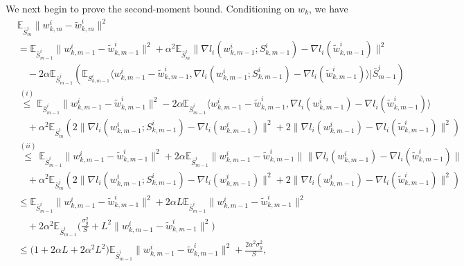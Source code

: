 \documentclass{osudissert96}
\begin{document}
	\vspace{0.1cm}
	We next begin to prove the second-moment bound. Conditioning on $w_k$, we have 
	{\small
	\begin{align*}
	&\mathbb{E}_{\bar S^i_m}\|w_{k,m}^i - \widetilde w_{k,m}^i\|^2 
	\\ &=   \mathbb{E}_{\bar S^i_{m-1}}\|w_{k,m-1}^i - \widetilde w_{k,m-1}^i\|^2  + 
	\alpha^2\mathbb{E}_{\bar S^i_m}\|\nabla l_i(w_{k,m-1}^i; S_{k,m-1}^i)- \nabla l_i(\widetilde w_{k,m-1}^i)\|^2
	\\ & \quad-2\alpha\mathbb{E}_{\bar S^i_{m-1}}\left(\mathbb{E}_{S_{k,m-1}^i} \langle w_{k,m-1}^i - \widetilde w_{k,m-1}^i, \nabla l_i(w_{k,m-1}^i; S_{k,m-1}^i)- \nabla l_i(\widetilde w_{k,m-1}^i)\rangle \big | \bar S^i_{m-1}\right)
	\\ &\overset{(i)}\leq   \mathbb{E}_{\bar S^i_{m-1}}\|w_{k,m-1}^i - \widetilde w_{k,m-1}^i\|^2  -2\alpha\mathbb{E}_{\bar S^i_{m-1}} \langle w_{k,m-1}^i - \widetilde w_{k,m-1}^i, \nabla l_i(w_{k,m-1}^i)- \nabla l_i(\widetilde w_{k,m-1}^i)\rangle
	\\ &\quad +
	\alpha^2\mathbb{E}_{\bar S^i_m}\left(  2\|\nabla l_i(w_{k,m-1}^i; S_{k,m-1}^i)- \nabla l_i( w_{k,m-1}^i)\|^2 + 2\|\nabla l_i( w_{k,m-1}^i)- \nabla l_i(\widetilde w_{k,m-1}^i)\|^2 \right)
	\\ &\overset{(ii)}\leq   \mathbb{E}_{\bar S^i_{m-1}}\|w_{k,m-1}^i - \widetilde w_{k,m-1}^i\|^2  +2\alpha\mathbb{E}_{\bar S^i_{m-1}} \| w_{k,m-1}^i - \widetilde w_{k,m-1}^i\|\|\nabla l_i(w_{k,m-1}^i)- \nabla l_i(\widetilde w_{k,m-1}^i)\|
	\\ & \quad+
	\alpha^2\mathbb{E}_{\bar S^i_m}\left(  2\|\nabla l_i(w_{k,m-1}^i; S_{k,m-1}^i)- \nabla l_i( w_{k,m-1}^i)\|^2 + 2\|\nabla l_i( w_{k,m-1}^i)- \nabla l_i(\widetilde w_{k,m-1}^i)\|^2 \right)
	\\ &\leq   \mathbb{E}_{\bar S^i_{m-1}}\|w_{k,m-1}^i - \widetilde w_{k,m-1}^i\|^2  +2\alpha L\mathbb{E}_{\bar S^i_{m-1}} \| w_{k,m-1}^i - \widetilde w_{k,m-1}^i\|^2
	\\ & \quad+
	2\alpha^2\mathbb{E}_{\bar S^i_{m-1}}\Big(  \frac{\sigma_g^2}{S}+ L^2\|w_{k,m-1}^i-  \widetilde w_{k,m-1}^i\|^2 \Big) 
	\\ &\leq \big(1+2\alpha L+2\alpha^2 L^2\big)  \mathbb{E}_{\bar S^i_{m-1}}\|w_{k,m-1}^i - \widetilde w_{k,m-1}^i\|^2   + \frac{2\alpha^2\sigma_g^2}{S},
	\end{align*}}
\end{document}
